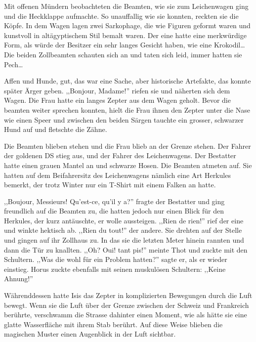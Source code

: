 \documentclass[11pt,titlepage,a5paper]{book}
\begin{document}
Mit offenen Mündern beobachteten die Beamten, wie sie zum Leichenwagen ging und die Heckklappe aufmachte. So unauffallig wie sie konnten, reckten sie die Köpfe. In dem Wagen lagen zwei Sarkophage, die wie Figuren geformt waren und kunstvoll in altägyptischem Stil bemalt waren. Der eine hatte eine merkwürdige Form, als würde der Besitzer ein sehr langes Gesicht haben, wie eine Krokodil\dots Die beiden Zollbeamten schauten sich an und taten sich leid, immer hatten sie Pech\dots

Affen und Hunde, gut, das war eine Sache, aber historische Artefakte, das konnte später Ärger geben. ,,Bonjour, Madame!'' riefen sie und näherten sich dem Wagen. Die Frau hatte ein langes Zepter aus dem Wagen geholt. Bevor die beamten weiter sprechen konnten, hielt die Frau ihnen den Zepter unter die Nase wie einen Speer und zwischen den beiden Särgen tauchte ein grosser, schwarzer Hund auf und fletschte die Zähne.

Die Beamten blieben stehen und die Frau blieb an der Grenze stehen. Der Fahrer der goldenen DS stieg aus, und der Fahrer des Leichenwagens. Der Bestatter hatte einen grauen Mantel an und schwarze Hosen. Die Beamten atmeten auf. Sie hatten auf dem Beifahrersitz des Leichenwagens nämlich eine Art Herkules bemerkt, der trotz Winter nur ein T-Shirt mit einem Falken an hatte. 

,,Boujour, Messieurs! Qu'est-ce, qu'il y a?'' fragte der Bestatter und ging freundlich auf die Beamten zu, die hatten jedoch nur einen Blick für den Herkules, der kurz antäuschte, er wolle aussteigen. ,,Rien de rien!'' rief der eine und winkte hektisch ab. ,,Rien du tout!'' der andere. Sie drehten auf der Stelle und gingen auf ihr Zollhaus zu. In das sie die letzten Meter hinein rannten und dann die Tür zu knallten. ,,Oh? Oui! tant pis!'' meinte Thot und zuckte mit den Schultern. ,,Was die wohl für ein Problem hatten?'' sagte er, als er wieder einstieg. Horus zuckte ebenfalls mit seinen muskulösen Schultern: ,,Keine Ahnung!'' 

 Währenddessen hatte Isis das Zepter in komplizierten Bewegungen durch die Luft bewegt. Wenn sie die Luft über der Grenze zwischen der Schweiz und Frankreich berührte, verschwamm die Strasse dahinter einen Moment, wie als hätte sie eine glatte Wasserfläche mit ihrem Stab berührt. Auf diese Weise blieben die magischen Muster einen Augenblick in der Luft sichtbar. 
 
\end{document}
